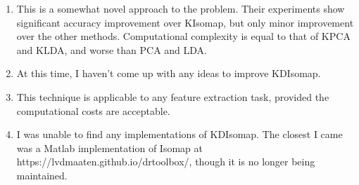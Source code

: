 \documentclass[11pt]{article}
\begin{document}
\begin{enumerate}
    \item This is a somewhat novel approach to the problem. Their experiments
        show significant accuracy improvement over KIsomap, but only minor
        improvement over the other methods. Computational complexity is equal to
        that of KPCA and KLDA, and worse than PCA and LDA.

    \item At this time, I haven't come up with any ideas to improve KDIsomap.

    \item This technique is applicable to any feature extraction task, provided
        the computational costs are acceptable.

    \item I was unable to find any implementations of KDIsomap. The closest I
        came was a Matlab implementation of Isomap at
        https://lvdmaaten.github.io/drtoolbox/, though it is no longer being
        maintained.
\end{enumerate}



\end{document}
